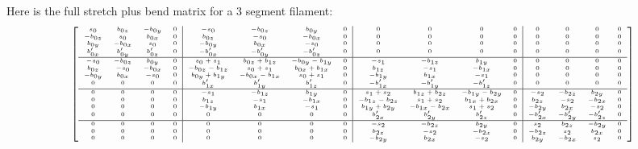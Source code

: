 \documentclass {scrbook}
\begin{document}
Here is the full stretch plus bend matrix for a 3 segment filament:
$$\tiny
\left[ \begin{array}{cccc|cccc|cccc|cccc}
s_0 & b_{0z} & -b_{0y} & 0     & -s_0 & -b_{0z} & b_{0y} & 0   & 0 & 0 & 0 & 0    & 0 & 0 & 0 & 0 \\
-b_{0z} & s_0 & b_{0x} & 0     & b_{0z} & -s_0 & -b_{0x} & 0   & 0 & 0 & 0 & 0    & 0 & 0 & 0 & 0 \\
b_{0y} & -b_{0x} & s_0 & 0     & -b_{0y} & b_{0x} & -s_0 & 0   & 0 & 0 & 0 & 0    & 0 & 0 & 0 & 0 \\
b'_{0x} & b'_{0y} & b'_{0z} & 0  & -b'_{0x} & -b'_{0y} & -b'_{0z} & 0    & 0 & 0 & 0 & 0    & 0 & 0 & 0 & 0 \\ \hline
-s_0 & -b_{0z} & b_{0y} & 0     & s_0+s_1 & b_{0z}+b_{1z} & -b_{0y}-b_{1y} & 0    & -s_1 & -b_{1z}  & b_{1y} & 0   & 0 & 0  & 0 & 0 \\
b_{0z} & -s_0 & -b_{0x} & 0     & -b_{0z}-b_{1z} & s_0+s_1 & b_{0x}+b_{1x} & 0   & b_{1z} & -s_1 & -b_{1x} & 0   & 0 & 0 & 0 & 0 \\
-b_{0y} & b_{0x} & -s_0 & 0     & b_{0y}+b_{1y} & -b_{0x}-b_{1x} & s_0+s_1 & 0   & -b_{1y} & b_{1x} & -s_1 & 0   & 0 & 0 & 0 & 0 \\
0 & 0 & 0 & 0    & b'_{1x} & b'_{1y} & b'_{1z} & 0   & -b'_{1x} & -b'_{1y} & -b'_{1z} & 0    & 0 & 0 & 0 & 0 \\ \hline
0 & 0 & 0 & 0    & -s_1 & -b_{1z} & b_{1y} & 0    & s_1+s_2 & b_{1z}+b_{2z} & -b_{1y}-b_{2y} & 0   & -s_2 & -b_{2z} & b_{2y} & 0 \\
0 & 0 & 0 & 0    & b_{1z} & -s_1 & -b_{1x} & 0    & -b_{1z}-b_{2z} & s_1+s_2 & b_{1x}+b_{2x} & 0    & b_{2z} & -s_2 & -b_{2x} & 0 \\
0 & 0 & 0 & 0    & -b_{1y} & b_{1x} & -s_1 & 0    & b_{1y}+b_{2y} & -b_{1x}-b_{2x} & s_1+s_2 & 0    & -b_{2y} & b_{2x} & -s_2 & 0 \\
0 & 0 & 0 & 0    & 0 & 0 & 0 & 0    & b'_{2x} & b'_{2y} & b'_{2z} & 0    & -b'_{2x} & -b'_{2y} & -b'_{2z} & 0 \\ \hline
0 & 0 & 0 & 0    & 0 & 0 & 0 & 0    & -s_2 & -b_{2z} & b_{2y} & 0    & s_2 & b_{2z} & -b_{2y} & 0 \\
0 & 0 & 0 & 0    & 0 & 0 & 0 & 0    & b_{2z} & -s_2 & -b_{2x} & 0    & -b_{2z} & s_2 & b_{2x} & 0 \\
0 & 0 & 0 & 0    & 0 & 0 & 0 & 0    & -b_{2y} & b_{2x} & -s_2 & 0    & b_{2y} & -b_{2x} & s_2 & 0
\end{array} \right]
$$
\end{document}
